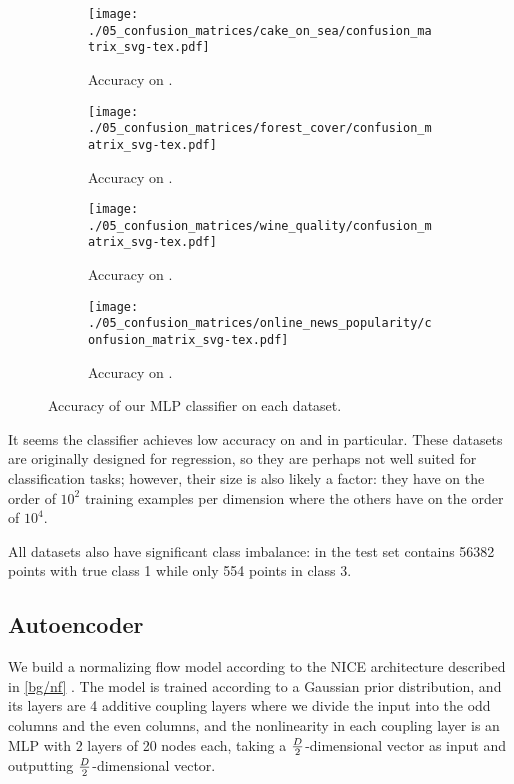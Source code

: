 \documentclass[../main.tex]{subfiles}
\begin{document}
\begin{figure}
    \centering
    \begin{subfigure}[b]{0.4\textwidth}
        \centering
\texttt{[image: ./05\_confusion\_matrices/cake\_on\_sea/confusion\_matrix\_svg-tex.pdf]}
        \caption{Accuracy on \CakeOnSea.}
\label{fig:cos_confusion_matrix}
    \end{subfigure}
    \begin{subfigure}[b]{0.4\textwidth}
        \centering
\texttt{[image: ./05\_confusion\_matrices/forest\_cover/confusion\_matrix\_svg-tex.pdf]}
        \caption{Accuracy on \ForestCover.}
    \end{subfigure}

    \begin{subfigure}[b]{0.4\textwidth}
        \centering
\texttt{[image: ./05\_confusion\_matrices/wine\_quality/confusion\_matrix\_svg-tex.pdf]}
        \caption{Accuracy on \WineQuality.}
    \end{subfigure}
    \begin{subfigure}[b]{0.4\textwidth}
        \centering
\texttt{[image: ./05\_confusion\_matrices/online\_news\_popularity/confusion\_matrix\_svg-tex.pdf]}
        \caption{Accuracy on \OnlineNewsPopularity.}
    \end{subfigure}

    \caption{Accuracy of our MLP classifier on each dataset.}
    \label{fig:confusion_matrices}
\end{figure}

It seems the classifier achieves low accuracy on \WineQuality{} and \OnlineNewsPopularity{} in particular.
These datasets are originally designed for regression, so they are perhaps not well suited for classification tasks; however, their size is also likely a factor: they have on the order of $10^2$ training examples per dimension where the others have on the order of $10^4$.

All datasets also have significant class imbalance: in \ForestCover{} the test set contains 56382 points with true class 1 while only 554 points in class 3.

\subsection{Autoencoder}

We build a normalizing flow model according to the NICE architecture described in \autoref{bg/nf} \cite{dinhNICE2015}.
The model is trained according to a Gaussian prior distribution, and its layers are 4 additive coupling layers where we divide the input into the odd columns and the even columns, and the nonlinearity in each coupling layer is an MLP with 2 layers of 20 nodes each, taking
a $\frac{D}{2}$-dimensional vector as input and outputting $\frac{D}{2}$-dimensional vector.
\end{document}
